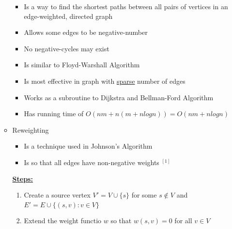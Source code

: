 \documentclass[12pt]{article}
\begin{document}
\begin{enumerate}[1.]
\begin{itemize}
        \begin{itemize}
            \item Is a way to find the shortest paths between all pairs of vertices
            in an edge-weighted, directed graph
            \item Allows some edges to be negative-number
            \item No negative-cycles may exist
            \item Is similar to Floyd-Warshall Algorithm
            \item Is most effective in graph with \underline{sparse} number of edges
            \item Works as a subroutine to Dijkstra and Bellman-Ford Algorithm
            \item Has running time of $O(nm + n(m + n log n)) = O(nm + nlog n)$
        \end{itemize}

        \item Reweighting
        \begin{itemize}
            \item Is a technique used in Johnson's Algorithm
            \item Is so that all edges have non-negative weights $^{[1]}$
        \end{itemize}

        \bigskip

        \underline{\textbf{Steps:}}

        \begin{enumerate}[1.]
            \item Create a source vertex $V' = V \cup \{s\}$ for some $s \notin V$ and $E' = E \cup \{(s,v): v \in V\}$
            \item Extend the weight functio $w$ so that $w(s,v) = 0$ for all $v \in V$


\end{enumerate}
\end{itemize}
\end{enumerate}
\end{document}
